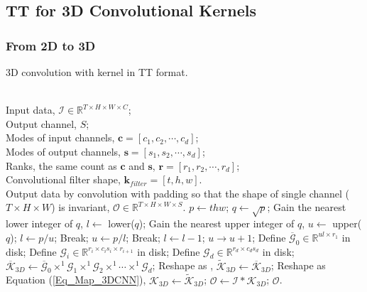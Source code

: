 \documentclass[a4paper,fleqn]{cas-dc}
\begin{document}
\subsection{TT for 3D Convolutional Kernels}

\subsubsection{From 2D to 3D}\quad

\begin{algorithm}[htb] 
\caption{3D convolution with kernel in TT format.}
\label{Alg_TT_3DCNN} 
\begin{algorithmic}[1]
\REQUIRE ~~\\
Input data, \(\bm{\mathcal{I}} \in \mathbb{R} ^{T \times H \times W \times C}\);\\
Output channel, \(S\);\\
Modes of input channels, \(\bm{c}=[c_1,c_2,\cdots,c_d]\);\\
Modes of output channels, \(\bm{s}=[s_1,s_2,\cdots,s_d]\);\\
Ranks, the same count as \(\bm{c}\) and \(\bm{s}\), \(\bm{r}=[r_1,r_2,\cdots,r_d]\);\\
Convolutional filter shape, \(\bm{k}_{filter}=[t,h,w]\).
\ENSURE ~~\\
Output data by convolution with padding so that the shape of single channel (\(T \times H \times W\)) is invariant, \(\bm{\mathcal{O}} \in \mathbb{R} ^{T \times H \times W \times S}\).
\STATE \(p \longleftarrow thw\);
\STATE \(q \longleftarrow \sqrt{p}\);
\STATE Gain the nearest lower integer of \(q\), \(l \longleftarrow\) lower(\(q\));
\STATE Gain the nearest upper integer of \(q\), \(u \longleftarrow\) upper(\(q\));
\STATE \(l \longleftarrow p/u\);
\STATE Break;
\STATE \(u \longleftarrow p/l\);
\STATE Break;
\ELSE
\STATE \(l \longleftarrow l-1\);
\STATE \(u \longrightarrow u+1\);
\ENDIF
\ENDWHILE
\STATE Define \(\overline{\bm{\mathcal{G}}}_{0} \in \mathbb{R} ^{ul \times r_1}\) in disk;
\STATE Define \(\bm{\mathcal{G}}_{i} \in \mathbb{R} ^{r_{i} \times c_{i}s_{i} \times r_{i+1}}\) in disk;
\ENDFOR
\STATE Define \(\bm{\mathcal{G}}_{d} \in \mathbb{R} ^{r_{d} \times c_{d}s_{d}}\) in disk;
\STATE \(\overline{\bm{\mathcal{K}}}_{3D} \longleftarrow \overline{\bm{\mathcal{G}}}_{0} \times^{1} \bm{\mathcal{G}}_{1} \times^{1} \bm{\mathcal{G}}_{2} \times^{1} \cdots \times^{1} \bm{\mathcal{G}}_{d}\);
\STATE Reshape as \citep{Garipov_2016_TTCNN}, \(\widetilde{\bm{\mathcal{K}}} _{3D} \longleftarrow \overline{\bm{\mathcal{K}}}_{3D}\);
\STATE Reshape as Equation (\ref{Eq_Map_3DCNN}), \(\bm{\mathcal{K}} _{3D} \longleftarrow \widetilde{\bm{\mathcal{K}}}_{3D}\);
\STATE \(\bm{\mathcal{O}} \longleftarrow \bm{\mathcal{I}} * \bm{\mathcal{K}} _{3D}\);
\RETURN \(\bm{\mathcal{O}}\).
\end{algorithmic}
\end{algorithm}
\end{document}
